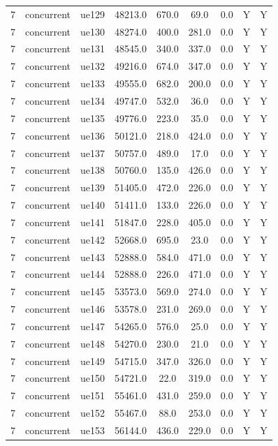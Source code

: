 \begin{table}[ht]
\begin{tabular}{|c|c|c|c|c|c|c|c|c|}
7 & concurrent & ue129 & 48213.0 & 670.0 & 69.0 & 0.0 & Y & Y \\
7 & concurrent & ue130 & 48274.0 & 400.0 & 281.0 & 0.0 & Y & Y \\
7 & concurrent & ue131 & 48545.0 & 340.0 & 337.0 & 0.0 & Y & Y \\
7 & concurrent & ue132 & 49216.0 & 674.0 & 347.0 & 0.0 & Y & Y \\
7 & concurrent & ue133 & 49555.0 & 682.0 & 200.0 & 0.0 & Y & Y \\
7 & concurrent & ue134 & 49747.0 & 532.0 & 36.0 & 0.0 & Y & Y \\
7 & concurrent & ue135 & 49776.0 & 223.0 & 35.0 & 0.0 & Y & Y \\
7 & concurrent & ue136 & 50121.0 & 218.0 & 424.0 & 0.0 & Y & Y \\
7 & concurrent & ue137 & 50757.0 & 489.0 & 17.0 & 0.0 & Y & Y \\
7 & concurrent & ue138 & 50760.0 & 135.0 & 426.0 & 0.0 & Y & Y \\
7 & concurrent & ue139 & 51405.0 & 472.0 & 226.0 & 0.0 & Y & Y \\
7 & concurrent & ue140 & 51411.0 & 133.0 & 226.0 & 0.0 & Y & Y \\
7 & concurrent & ue141 & 51847.0 & 228.0 & 405.0 & 0.0 & Y & Y \\
7 & concurrent & ue142 & 52668.0 & 695.0 & 23.0 & 0.0 & Y & Y \\
7 & concurrent & ue143 & 52888.0 & 584.0 & 471.0 & 0.0 & Y & Y \\
7 & concurrent & ue144 & 52888.0 & 226.0 & 471.0 & 0.0 & Y & Y \\
7 & concurrent & ue145 & 53573.0 & 569.0 & 274.0 & 0.0 & Y & Y \\
7 & concurrent & ue146 & 53578.0 & 231.0 & 269.0 & 0.0 & Y & Y \\
7 & concurrent & ue147 & 54265.0 & 576.0 & 25.0 & 0.0 & Y & Y \\
7 & concurrent & ue148 & 54270.0 & 230.0 & 21.0 & 0.0 & Y & Y \\
7 & concurrent & ue149 & 54715.0 & 347.0 & 326.0 & 0.0 & Y & Y \\
7 & concurrent & ue150 & 54721.0 & 22.0 & 319.0 & 0.0 & Y & Y \\
7 & concurrent & ue151 & 55461.0 & 431.0 & 259.0 & 0.0 & Y & Y \\
7 & concurrent & ue152 & 55467.0 & 88.0 & 253.0 & 0.0 & Y & Y \\
7 & concurrent & ue153 & 56144.0 & 436.0 & 229.0 & 0.0 & Y & Y \\

\end{tabular}
\end{table}
